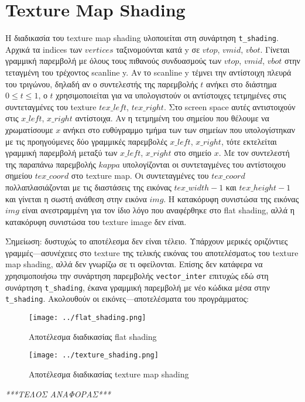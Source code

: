 \documentclass{article}
\begin{document}
\section{Texture Map Shading}
Η διαδικασία του texture map shading υλοποιείται στη συνάρτηση 
\verb|t_shading|.
Αρχικά τα indices των $vertices$ ταξινομούνται κατά y σε $vtop$,
$vmid$, $vbot$.
Γίνεται γραμμική παρεμβολή με όλους τους πιθανούς συνδυασμούς των $vtop$,
$vmid$, $vbot$ στην τεταγμένη του τρέχοντος scanline y. Αν το scanline y τέμνει την 
αντίστοιχη πλευρά του τριγώνου, δηλαδή αν ο συντελεστής της παρεμβολής $t$ ανήκει στο διάστημα
$0 \leq t \leq 1$, ο $t$ χρησιμοποιείται για να υπολογιστούν οι αντίστοιχες 
τετμημένες στις συντεταγμένες του texture $tex\_left$, $tex\_right$. Στο
screen space αυτές αντιστοιχούν στις $x\_left$, $x\_right$ αντίστοιχα.
Αν η τετμημένη του σημείου που θέλουμε να χρωματίσουμε $x$ ανήκει στο ευθύγραμμο
τμήμα των των σημείων που υπολογίστηκαν με τις προηγούμενες δύο 
γραμμικές παρεμβολές $x\_left$, $x\_right$, τότε εκτελείται γραμμική παρεμβολή
μεταξύ των $x\_left$, $x\_right$ στο σημείο $x$. Με τον συντελεστή της παραπάνω 
πα\-ρεμ\-βολής $kappa$ υπολογίζονται οι συντεταγμένες του αντίστοιχου σημείου 
$tex\_coord$ στο texture map. Οι συν\-τε\-ταγμένες του $tex\_coord$ πολλαπλασιάζονται 
με τις διαστάσεις της εικόνας $tex\_width - 1$ και $tex\_height - 1$ και γίνεται η 
σωστή ανάθεση στην εικόνα $img$. Η κατακόρυφη συνιστώσα της εικόνας $img$ είναι 
ανεστραμμένη για τον ίδιο λόγο που αναφέρθηκε στο flat shading, αλλά
η κατακόρυφη συνιστώσα του texture image δεν είναι.

Σημείωση: δυστυχώς το αποτέλεσμα δεν είναι τέλειο. Υπάρχουν μερικές
οριζόντιες γραμμές---ασυνέ\-χειες στο texture της τελικής εικόνας του
αποτελέσματoς του texture map shading, αλλά δεν γνωρίζω
σε τι οφείλονται. Επίσης δεν κατάφερα να 
χρησιμοποιήσω την συνάρτηση παρεμβολής \verb|vector_inter| επιτυχώς εδώ στη 
συνάρτηση \verb|t_shading|, έκα\-να γραμμική παρεμβολή με νέο κώδικα μέσα
στην \verb|t_shading|. Ακολουθούν οι εικόνες---αποτελέσματα του προγράμματος:

\begin{figure}
    \centering
    \begin{subcaptionblock}{.45\textwidth}
        \texttt{[image: ../flat\_shading.png]}
        \caption{Αποτέλεσμα διαδικασίας flat shading}
    \end{subcaptionblock}
    \centering
    \begin{subcaptionblock}{.45\textwidth}
        \texttt{[image: ../texture\_shading.png]}
        \caption{Αποτέλεσμα διαδικασίας texture map shading}
    \end{subcaptionblock}
\end{figure}

\newpage

\vspace{2em}
\centering
\emph{***ΤΕΛΟΣ ΑΝΑΦΟΡΑΣ***}
\end{document}
